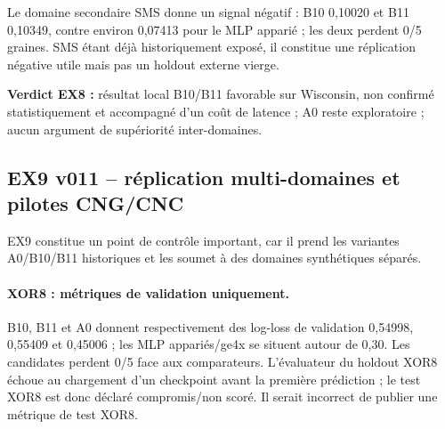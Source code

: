\documentclass[11pt,a4paper]{article}
\begin{document}
Le domaine secondaire SMS donne un signal négatif : B10 0,10020 et B11 0,10349, contre environ 0,07413 pour le MLP apparié ; les deux perdent 0/5 graines. SMS étant déjà historiquement exposé, il constitue une réplication négative utile mais pas un holdout externe vierge.

\textbf{Verdict EX8 :} résultat local B10/B11 favorable sur Wisconsin, non confirmé statistiquement et accompagné d'un coût de latence ; A0 reste exploratoire ; aucun argument de supériorité inter-domaines.

\subsection{EX9 v011 -- réplication multi-domaines et pilotes CNG/CNC}

EX9 constitue un point de contrôle important, car il prend les variantes A0/B10/B11 historiques et les soumet à des domaines synthétiques séparés.

\paragraph{XOR8 : métriques de validation uniquement.} B10, B11 et A0 donnent respectivement des log-loss de validation 0,54998, 0,55409 et 0,45006 ; les MLP appariés/ge4x se situent autour de 0,30. Les candidates perdent 0/5 face aux comparateurs. L'évaluateur du holdout XOR8 échoue au chargement d'un checkpoint avant la première prédiction ; le test XOR8 est donc déclaré compromis/non scoré. Il serait incorrect de publier une métrique de test XOR8.
\end{document}

